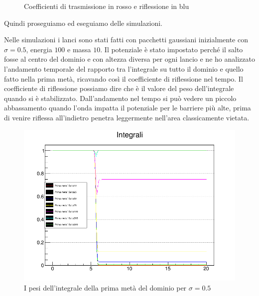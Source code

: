 \begin{figure}[hbt]
  \centering
  \caption{Coefficienti di trasmissione in rosso e riflessione in blu}
\end{figure}

Quindi proseguiamo ed eseguiamo delle simulazioni.

Nelle simulazioni i lanci sono stati fatti con pacchetti gaussiani inizialmente con $\sigma=0.5$, energia $100$ e massa $10$. Il potenziale \`e stato impostato perch\'e il salto fosse al centro del dominio e con altezza diversa per ogni lancio e ne ho analizzato l'andamento temporale del rapporto tra l'integrale su tutto il dominio e quello fatto nella prima met\`a, ricavando cos\`i il coefficiente di riflessione nel tempo.
Il coefficiente di riflessione possiamo dire che \`e il valore del peso dell'integrale quando si \`e stabilizzato.
Dall'andamento nel tempo si pu\`o vedere un piccolo abbassamento quando l'onda impatta il potenziale per le barriere pi\`u alte, prima di venire riflessa all'indietro penetra leggermente nell'area classicamente vietata.

\begin{figure}[htb]
  \centering
  \includegraphics[width=0.7\linewidth]{IMG/SaltoR}
  \caption{I pesi dell'integrale della prima met\`a del dominio per $\sigma=0.5$}\label{fig:SaltoR}
\end{figure}

